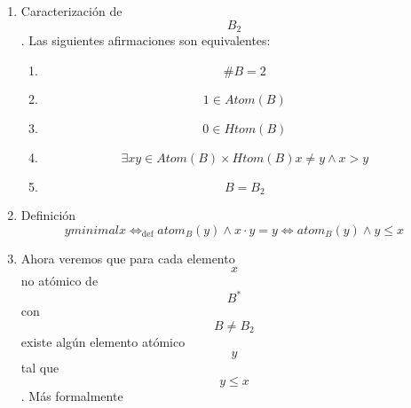 \begin{enumerate}
\begin{enumerate}
\begin{enumerate}
\begin{enumerate}
        \begin{enumerate}
        \def\labelenumv{\arabic{enumv}.}
        \tightlist
        \item
          \[\varphi{{{(\overline{x})} = \begin{Bmatrix}
          {1\Leftarrow{x = i}} \\
          {0\Leftarrow{x = s}}
          \end{Bmatrix}} =}\]
        \item
          \[{= \begin{Bmatrix}
          {\overline{0}\Leftarrow{x = i}} \\
          {\overline{1}\Leftarrow{x = s}}
          \end{Bmatrix}} =\]
        \item
          \[{= \begin{Bmatrix}
          {\overline{\varphi{(i)}}\Leftarrow{x = i}} \\
          {\overline{\varphi{(s)}}\Leftarrow{x = s}}
          \end{Bmatrix}} = \overline{\varphi{(x)}}\]
        \end{enumerate}
      \end{enumerate}
    \item
      Caracterización de \[B_{2}\]. Las siguientes afirmaciones son
      equivalentes:

      \begin{enumerate}
      \def\labelenumiv{\arabic{enumiv}.}
      \tightlist
      \item
        \[\#{B = 2}\]
      \item
        \[{1 \in \mathit{Atom}}{(B)}\]
      \item
        \[{0 \in \mathit{Htom}}{(B)}\]
      \item
        \[\exists{\mathit{xy} \in {\mathit{Atom}{{(B)} \times \mathit{Htom}}{(B)}}}{{x \neq {y \land x}} > y}\]
      \item
        \[B = B_{2}\]
      \end{enumerate}
    \item
      Definición
      \[y\mathsf{\mathit{minimal}}x\Leftrightarrow_{\text{def}}\mathsf{\mathit{atom}}_{B}{{{{(y)} \land x} \cdot y} = y}\Leftrightarrow\mathsf{\mathit{atom}}_{B}{{{(y)} \land y} \leq x}\]
    \item
      Ahora veremos que para cada elemento \[x\] no atómico de
      \[B^{\ast}\] con \[B \neq B_{2}\] existe algún elemento atómico
      \[y\] tal que \[y \leq x\]. Más formalmente


\end{enumerate}
\end{enumerate}
\end{enumerate}
